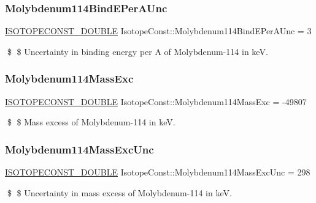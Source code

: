 \subsubsection{\texorpdfstring{Molybdenum114\+Bind\+E\+Per\+A\+Unc}{Molybdenum114BindEPerAUnc}}
{\footnotesize\ttfamily \mbox{\hyperlink{group___isotope_const-_macros_ga8f45a7272ce02c0b4c65c44636ed719a}{I\+S\+O\+T\+O\+P\+E\+C\+O\+N\+S\+T\+\_\+\+D\+O\+U\+B\+LE}} Isotope\+Const\+::\+Molybdenum114\+Bind\+E\+Per\+A\+Unc = 3}

\$ \$ Uncertainty in binding energy per A of Molybdenum-\/114 in keV. \mbox{\label{group___isotope_const-_molybdenum-_mo114_gadda4fe122ea67d3e6a1336b364f6b6dd}} 
\subsubsection{\texorpdfstring{Molybdenum114\+Mass\+Exc}{Molybdenum114MassExc}}
{\footnotesize\ttfamily \mbox{\hyperlink{group___isotope_const-_macros_ga8f45a7272ce02c0b4c65c44636ed719a}{I\+S\+O\+T\+O\+P\+E\+C\+O\+N\+S\+T\+\_\+\+D\+O\+U\+B\+LE}} Isotope\+Const\+::\+Molybdenum114\+Mass\+Exc = -\/49807}

\$ \$ Mass excess of Molybdenum-\/114 in keV. \mbox{\label{group___isotope_const-_molybdenum-_mo114_gae9f887dff710fb4e8ec388ee8dd532e7}} 
\subsubsection{\texorpdfstring{Molybdenum114\+Mass\+Exc\+Unc}{Molybdenum114MassExcUnc}}
{\footnotesize\ttfamily \mbox{\hyperlink{group___isotope_const-_macros_ga8f45a7272ce02c0b4c65c44636ed719a}{I\+S\+O\+T\+O\+P\+E\+C\+O\+N\+S\+T\+\_\+\+D\+O\+U\+B\+LE}} Isotope\+Const\+::\+Molybdenum114\+Mass\+Exc\+Unc = 298}

\$ \$ Uncertainty in mass excess of Molybdenum-\/114 in keV. \mbox{\label{group___isotope_const-_molybdenum-_mo114_gac0ae9a71e323ab003b7cdf91747629be}} 
